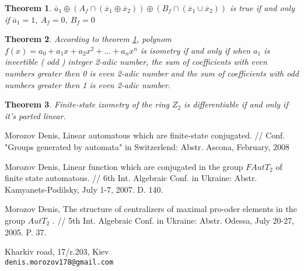 \documentclass[12pt]{article}
\newtheorem{theorem}{Theorem}
\newcommand{\address}[2]
{\vspace{-3mm}\medskip \noindent
\begin{minipage}[t]{7.5cm}
\small{#1 \\
\tt{#2}}
\end{minipage}}
\begin{document}
  \begin{theorem}\label{istformul}
    $\overline{ a}_1\oplus (A_f\cap (\overline{x}_1\oplus \overline{x}_2))\oplus (B_f\cap (\overline{x}_1\cup \overline{x}_2))$
    is true if and only if $\overline{ a}_1=1,\ A_f=0,\ B_f=0$
  \end{theorem}

  \begin{theorem}\label{naslidok2} According to theorem \ref{istformul}, polynom
   $f(x)=a_0+a_1x+a_2x^2+...+a_nx^n$ is isometry if and only if when $a_1$
   is invertible ( odd ) integer 2-adic number,
   the sum of coefficients with even numbers greater then 0 is even 2-adic number
    and the sum of coefficients with odd numbers greater then 1 is
    even
    2-adic number.
   \end{theorem}

   \begin{theorem} Finite-state izometry of the ring $Z_2$ is
   differentiable if and only if it's parted linear.
   \end{theorem}






\vspace{-5mm}\small
\begin{thebibliography}{3}
Morozov Denis,      Linear automatous which are finite-state
conjugated.  //  Conf. "Groups generated by automata" in
Switzerlend:  Abstr.  Ascona,  February,  2008

Morozov Denis,      Linear function which are conjugated in
the group  $FAutT_2$  of  finite state automatous.
// 6th Int.  Algebraic Conf.  in  Ukraine:  Abstr.
Kamyanets-Podilsky, July  1-7,  2007.  D. 140.

Morozov Denis,  The structure of centralizers of maximal
pro-oder elements in the group  $AutT_2$ . // 5th Int. Algebraic
Conf. in Ukraine: Abstr. Odessa, July 20-27, 2005.  P. 37.

\end{thebibliography}

\address{Kharkiv road, 17/r.203, Kiev}{denis.morozov178@gmail.com}
\end{document}

